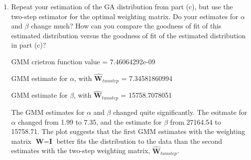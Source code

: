 \documentclass[letterpaper,12pt]{article}
\theoremstyle{definition}
\begin{document}
\begin{enumerate}
\begin{enumerate}
\item Repeat your estimation of the GA distribution from part (c), but use the two-step estimator for the optimal weighting matrix. Do your estimates for $\alpha$ and $\beta$ change much? How can you compare the goodness of fit of this estimated distribution versus the goodness of fit of the estimated distribution in part (c)?
\par
\begin{figure}[H]\centering\captionsetup{width=4.0in}
\end{figure}
\par
GMM crietron function value = 7.46064292e-09\par
GMM estimate for $\alpha$, with $\hat{\textbf{W}}_{twostep}$ = 7.34581860994   \par
GMM estimate for $\beta$, with $\hat{\textbf{W}}_{twostep}$ = 15758.7078051\par
\bigskip
The GMM estimates for $\alpha$ and $\beta$ changed quite significantly. The esitmate for $\alpha$ changed from 1.99 to 7.35, and the estimate for $\beta$ from 27164.54 to 15758.71. The plot suggests that the first GMM estimates with the weighting matrix $\textbf{W} = \textbf{I}$ better fits the distribution to the data than the second estimates with the two-step weighting matrix, $\hat{\textbf{W}}_{twostep}$.
\end {enumerate}
\end {enumerate}
\end{document}
